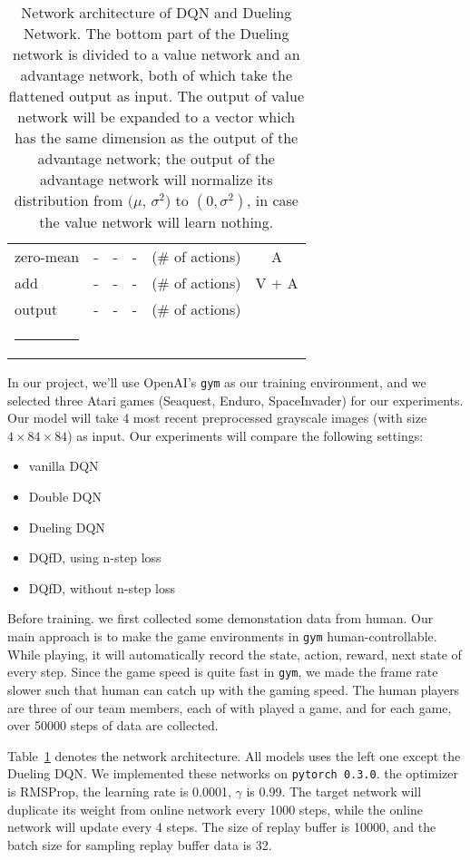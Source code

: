 \documentclass{article}
\makeatletter
\def\hlinewd#1{%
  \noalign{\ifnum0=`}\fi\hrule \@height #1 \futurelet
   \reserved@a\@xhline}
\makeatother
\begin{document}
\begin{table}[]
{\begin{tabular}{lccccc}
 zero-mean & - & - & - & (\# of actions) & A\\
\hdashline
 add & - & - & - & (\# of actions) & V + A\\
 output & - & - & - & (\# of actions) &\\
\hlinewd{1.25pt}
\end{tabular}
}
\caption{ Network architecture of DQN and Dueling Network. The bottom part of the Dueling network is divided to a value network and an advantage network, both of which take the flattened output as input. The output of value network will be expanded to a vector which has the same dimension as the output of the advantage network; the output of the advantage network will normalize its distribution from $(\mu$, $\sigma^2)$ to $(0, \sigma^2)$, in case the value network will learn nothing.}
\label{tab:dqn}
\end{table}
In our project, we'll use OpenAI's \texttt{gym} as our training environment, and we selected three Atari games (Seaquest, Enduro, SpaceInvader) for our experiments. Our model will take 4 most recent preprocessed grayscale images (with size $4\times 84 \times 84$) as input. Our experiments will compare the following settings:
\begin{itemize}
    \item vanilla DQN
    \item Double DQN
    \item Dueling DQN
    \item DQfD, using n-step loss
    \item DQfD, without n-step loss
\end{itemize}

Before training. we first collected some demonstation data from human. Our main approach is to make the game environments in \texttt{gym} human-controllable. While playing, it will automatically record the state, action, reward, next state of every step. Since the game speed is quite fast in \texttt{gym}, we made the frame rate slower such that human can catch up with the gaming speed. The human players are three of our team members, each of with played a game, and for each game, over 50000 steps of data are collected.




Table~\ref{tab:dqn} denotes the network architecture. All models uses the left one except the Dueling DQN. We implemented these networks on \texttt{pytorch 0.3.0}. the optimizer is RMSProp, the learning rate is 0.0001, $\gamma$ is 0.99. The target network will duplicate its weight from online network every 1000 steps, while the online network will update every 4 steps. The size of replay buffer is 10000, and the batch size for sampling replay buffer data is 32.\par
\end{document}
